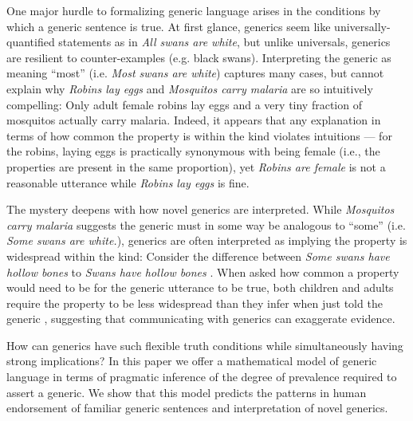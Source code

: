 \documentclass[10pt,letterpaper]{article}
\newcommand{\ndg}[1]{\textcolor{Green}{[ndg: #1]}}
\begin{document}
One major hurdle to formalizing generic language arises in the conditions by which a generic sentence is true.
At first glance, generics seem like universally-quantified statements as in \emph{All swans are white}, but unlike universals, generics are resilient to counter-examples (e.g. black swans). 
Interpreting the generic as meaning ``most'' (i.e. \emph{Most swans are white}) captures many cases, but cannot explain why \emph{Robins lay eggs} and \emph{Mosquitos carry malaria} are so intuitively compelling: Only adult female robins lay eggs and a very tiny fraction of mosquitos actually carry malaria.
Indeed, it appears that any explanation in terms of how common the property is within the kind violates intuitions --- for the robins, laying eggs is practically synonymous with being female (i.e., the properties are present in the same proportion), yet \emph{Robins are female} is not a reasonable utterance while \emph{Robins lay eggs} is fine.


The mystery deepens with how novel generics are interpreted.
While \emph{Mosquitos carry malaria} suggests the generic must in some way be analogous to ``some'' (i.e. \emph{Some swans are white.}), generics are often interpreted as implying the property is widespread within the kind:
Consider the difference between \emph{Some swans have hollow bones} to \emph{Swans have hollow bones} \cite{Gelman2002}.
When asked how common a property would need to be for the generic utterance to be true, both children and adults require the property to be less widespread than they infer when just told the generic \cite{Cimpian2010,Brandone2014}, suggesting that communicating with generics can exaggerate evidence.

How can generics have such flexible truth conditions while simultaneously having strong implications?
In this paper we offer a mathematical model of generic language in terms of pragmatic inference of the degree of prevalence required to assert a generic.  
We show that this model predicts the patterns in human endorsement of familiar generic sentences and interpretation of novel generics. 
\end{document}
